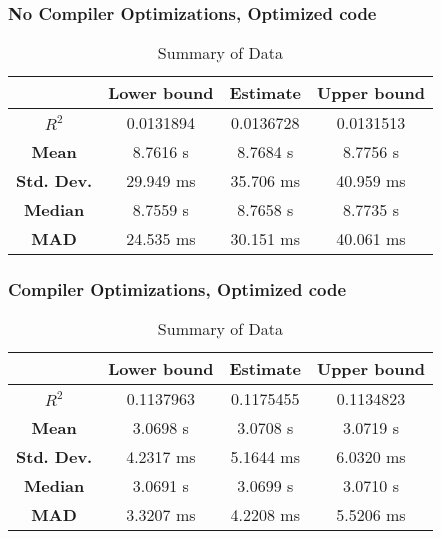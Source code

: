 \subsubsection{No Compiler Optimizations, Optimized code}
\begin{table}[H]
\centering
\begin{tabular}{|c|c|c|c|}
\hline
\textbf{} & \textbf{Lower bound} & \textbf{Estimate} & \textbf{Upper bound} \\
\hline
\textbf{$R^2$} & 0.0131894 & 0.0136728 & 0.0131513 \\
\hline
\textbf{Mean} & 8.7616 s & 8.7684 s & 8.7756 s \\
\hline
\textbf{Std. Dev.} & 29.949 ms & 35.706 ms & 40.959 ms \\
\hline
\textbf{Median} & 8.7559 s & 8.7658 s & 8.7735 s \\
\hline
\textbf{MAD} & 24.535 ms & 30.151 ms & 40.061 ms \\
\hline
\end{tabular}
\caption{Summary of Data}
\label{tab:data_summary_5}
\end{table}


\subsubsection{Compiler Optimizations, Optimized code}
\begin{table}[H]
\centering
\begin{tabular}{|c|c|c|c|}
\hline
\textbf{} & \textbf{Lower bound} & \textbf{Estimate} & \textbf{Upper bound} \\
\hline
\textbf{$R^2$} & 0.1137963 & 0.1175455 & 0.1134823 \\
\hline
\textbf{Mean} & 3.0698 s & 3.0708 s & 3.0719 s \\
\hline
\textbf{Std. Dev.} & 4.2317 ms & 5.1644 ms & 6.0320 ms \\
\hline
\textbf{Median} & 3.0691 s & 3.0699 s & 3.0710 s \\
\hline
\textbf{MAD} & 3.3207 ms & 4.2208 ms & 5.5206 ms \\
\hline
\end{tabular}
\caption{Summary of Data}
\label{tab:data_summary_6}
\end{table}


